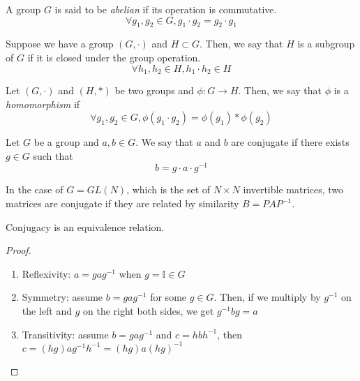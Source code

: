 \begin{definition}
    A group $G$ is said to be \emph{abelian} if its operation is commutative.
    \begin{equation}
        \forall g_1, g_2 \in G, g_1 \cdot g_2 = g_2 \cdot g_1
        \label{eq:abelian_group}
    \end{equation}
\end{definition}

\begin{definition}[Subgroup]
    Suppose we have a group $(G, \cdot)$ and $H \subset G$. Then, we say that $H$ is a subgroup of $G$ if it is closed under the group operation.
    \begin{equation*}
        \forall h_1, h_2 \in H, h_1 \cdot h_2 \in H
    \end{equation*}
\end{definition}

\begin{definition}[Homomorphism]
    Let $(G, \cdot)$ and $(H, \ast)$ be two groups and $\phi: G \rightarrow H$.
    Then, we say that $\phi$ is a \emph{homomorphism} if
    \begin{equation*}
        \forall g_1, g_2 \in G, \phi(g_1 \cdot g_2) = \phi(g_1) \ast \phi(g_2)
    \end{equation*}
\end{definition}

\begin{definition}[Conjugation]
    Let $G$ be a group and $a, b \in G$. We say that $a$ and $b$ are conjugate if there exists $g \in G$ such that
    \begin{equation*}
        b = g \cdot a \cdot g^{-1}
    \end{equation*}
\end{definition}
\begin{example}
    In the case of $G = GL(N)$, which is the set of $N \times N$ invertible matrices, two matrices are conjugate if they are related by similarity $B = P A P^{-1}$.
\end{example}

\begin{proposition}
    Conjugacy is an equivalence relation.
\end{proposition}
\begin{proof}
    \begin{enumerate}
        \item Reflexivity: $a = gag^{-1}$ when $g = \mathbb{I} \in G$
        \item Symmetry: assume $b = gag^{-1}$ for some $g \in G$. Then, if we multiply by $g^{-1}$ on the left and $g$ on the right both sides, we get $g^{-1}bg = a$
        \item Transitivity: assume $b = gag^{-1}$ and $c=hbh^{-1}$, then $c = (hg)ag^{-1}h^{-1} = (hg)a(hg)^{-1}$
    \end{enumerate}
\end{proof}

